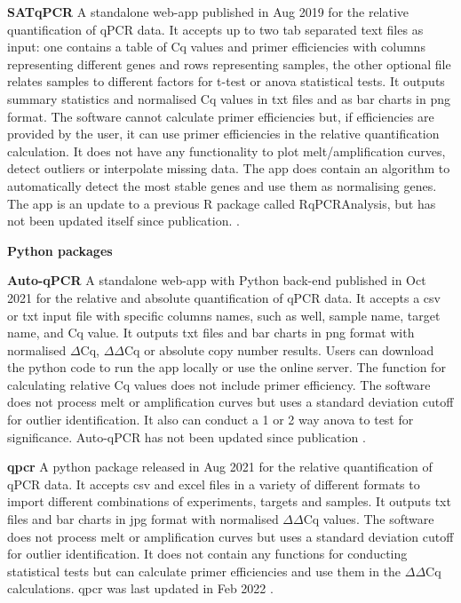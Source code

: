 \documentclass{SBCbookchapter}
\begin{document}
\textbf{SATqPCR} A standalone web-app published in Aug 2019 for the relative quantification of qPCR data. It accepts up to two tab separated text files as input: one contains a table of Cq values and primer efficiencies with columns representing different genes and rows representing samples, the other optional file relates samples to different factors for t-test or anova statistical tests. It outputs summary statistics and normalised Cq values in txt files and as bar charts in png format. The software cannot calculate primer efficiencies but, if efficiencies are provided by the user, it can use primer efficiencies in the relative quantification calculation. It does not have any functionality to plot melt/amplification curves, detect outliers or interpolate missing data. The app does contain an algorithm to automatically detect the most stable genes and use them as normalising genes. The app is an update to a previous R package called RqPCRAnalysis, but has not been updated itself since publication. \cite{Rancurel2019}.


\textbf{Python packages}

\textbf{Auto-qPCR} A standalone web-app with Python back-end published in Oct 2021 for the relative and absolute quantification of qPCR data. It accepts a csv or txt input file with specific columns names, such as well, sample name, target name, and Cq value. It outputs txt files and bar charts in png format with normalised $\Delta$Cq, $\Delta\Delta$Cq or absolute copy number results. Users can download the python code to run the app locally or use the online server. The function for calculating relative Cq values does not include primer efficiency. The software does not process melt or amplification curves but uses a standard deviation cutoff for outlier identification. It also can conduct a 1 or 2 way anova to test for significance. Auto-qPCR has not been updated since publication \cite{Maussion2021}.

\textbf{qpcr}
A python package released in Aug 2021 for the relative quantification of qPCR data. It accepts csv and excel files in a variety of different formats to import different combinations of experiments, targets and samples. It outputs txt files and bar charts in jpg format with normalised $\Delta\Delta$Cq values. The software does not process melt or amplification curves but uses a standard deviation cutoff for outlier identification. It does not contain any functions for conducting statistical tests but can calculate primer efficiencies and use them in the $\Delta\Delta$Cq calculations. qpcr was last updated in Feb 2022 \cite{Kleinschmidt2022}.
\end{document}
